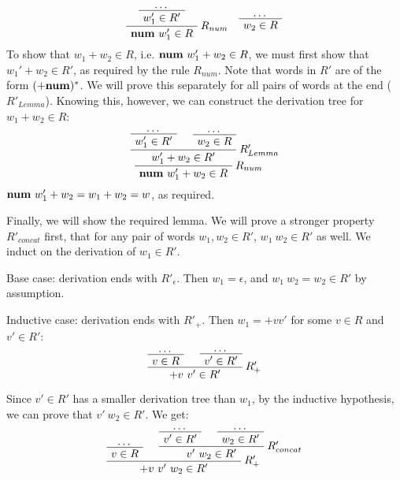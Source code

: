 \begin{exercise}{}
\begin{solution}
\begin{enumerate}
\begin{enumerate}
\begin{itemize}
\begin{gather*}
            \AxiomC{\ldots}
            \UnaryInfC{\(w_1' \in R'\)}
            \RightLabel{\(R_{num}\)}
            \UnaryInfC{\(\num ~w_1' \in R\)}
            \DisplayProof
            \quad
            \AxiomC{\ldots}
            \UnaryInfC{\(w_2 \in R\)}
            \DisplayProof
          \end{gather*}
          To show that \(w_1 + w_2 \in R\), i.e. \(\mathbf{num} ~w_1' + w_2 \in R\), we
          must first show that \(w_1' + w_2 \in R'\), as required by the rule
          \(R_{num}\). Note that words in \(R'\) are of the form \((+ \mathbf{num})^*\).
          We will prove this separately for all pairs of words at the end
          (\(R'_{Lemma}\)). Knowing this, however, we can construct the
          derivation tree for \(w_1 + w_2 \in R\):
          \begin{gather*}
            \AxiomC{\ldots}
            \UnaryInfC{\(w_1' \in R'\)}
            \AxiomC{\ldots}
            \UnaryInfC{\(w_2 \in R\)}
            \RightLabel{\(R'_{Lemma}\)}
            \BinaryInfC{\(w_1' + w_2 \in R'\)}
            \RightLabel{\(R_{num}\)}
            \UnaryInfC{\(\num ~w_1' + w_2 \in R\)}
            \DisplayProof
          \end{gather*}
          \(\mathbf{num} ~w_1' + w_2 = w_1 + w_2 = w\), as required.

          Finally, we will show the required lemma. We will prove a stronger
          property \(R'_{concat}\) first, that for any pair of words \(w_1, w_2
          \in R'\), \(w_1 ~w_2 \in R'\) as well. We induct on the derivation of
          \(w_1 \in R'\).
          
          Base case: derivation ends with \(R'_\epsilon\). Then \(w_1 =
          \epsilon\), and \(w_1 ~w_2 = w_2 \in R'\) by assumption. 
          
          Inductive case: derivation ends with \(R'_+\). Then \(w_1 = + v v'\)
          for some \(v \in R\) and \(v' \in R'\):
          \begin{gather*}
            \AxiomC{\ldots}
            \UnaryInfC{\(v \in R\)}
            \AxiomC{\ldots}
            \UnaryInfC{\(v' \in R'\)}
            \RightLabel{\(R'_+\)}
            \BinaryInfC{\(+ v ~v' \in R'\)}
            \DisplayProof
          \end{gather*}

          Since \(v' \in R'\) has a smaller derivation tree than \(w_1\), by the
          inductive hypothesis, we can prove that \(v'~w_2 \in R'\). We get:
          \begin{gather*}
            \AxiomC{\ldots}
            \UnaryInfC{\(v \in R\)}
            \AxiomC{\ldots}
            \UnaryInfC{\(v' \in R'\)}
            \AxiomC{\ldots}
            \UnaryInfC{\(w_2 \in R'\)}
            \RightLabel{\(R'_{concat}\)}
            \BinaryInfC{\(v' ~w_2 \in R'\)}
            \RightLabel{\(R'_+\)}
            \BinaryInfC{\(+ v ~v' ~w_2 \in R'\)}
            \DisplayProof
          \end{gather*}


\end{itemize}
\end{enumerate}
\end{enumerate}
\end{solution}
\end{exercise}
